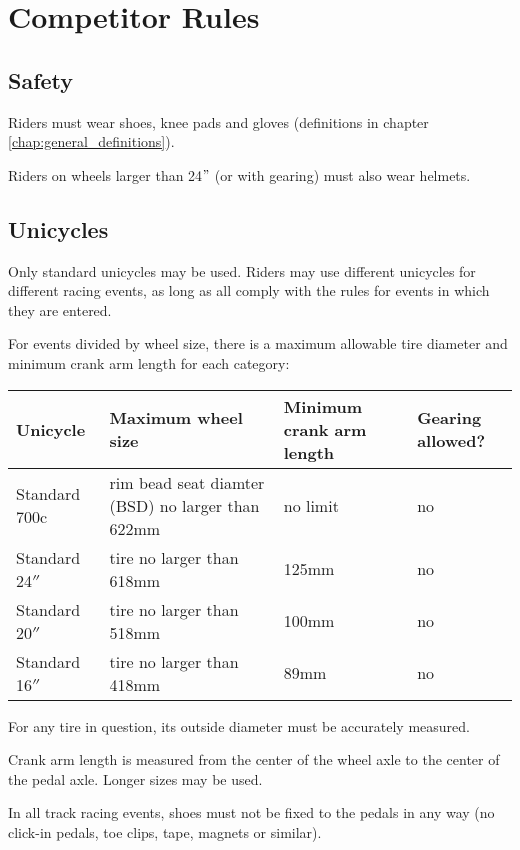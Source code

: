 \chapter{Competitor Rules}

\section{Safety}

Riders must wear shoes, knee pads and gloves (definitions in chapter \ref{chap:general_definitions}).

Riders on wheels larger than 24$"$ (or with gearing) must also wear helmets.

\section{Unicycles}

Only standard unicycles may be used. %
Riders may use different unicycles for different racing events, as long as all comply with the rules for events in which they are entered.

For events divided by wheel size, there is a maximum allowable tire diameter and minimum crank arm length for each category:

\begin{longtable}{|p{3cm}|p{5cm}|p{2cm}|p{2cm}|}
\hline
\textbf{Unicycle} & \textbf{Maximum wheel size} & \textbf{Minimum crank arm length} & \textbf{Gearing allowed?}\\
\hline
Standard 700c & rim bead seat diamter (BSD) 
no larger than 622mm & no limit & no \\
\hline
Standard 24$''$ & tire no larger than 618mm & 125mm & no \\
\hline
Standard 20$''$ & tire no larger than 518mm & 100mm & no \\
\hline
Standard 16$''$ & tire no larger than 418mm & 89mm & no \\
\hline
\end{longtable}

For any tire in question, its outside diameter must be accurately measured.

Crank arm length is measured from the center of the wheel axle to the center of the pedal axle. Longer sizes may be used.

In all track racing events, shoes must not be fixed to the pedals in any way (no click-in pedals, toe clips, tape, magnets or similar).%

